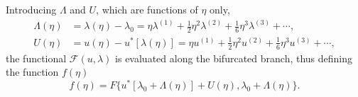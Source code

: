 \documentclass[12pt, final]{scrartcl}
\theoremstyle{definition}
\newcommand{\order}[2][1]{#2^{(#1)}}
\begin{document}
Introducing $\Lambda$ and $U$, which are functions of $\eta$ only,
\begin{align}
  \label{eq:20211112155446}
  \Lambda(\eta) & = \lambda(\eta) - \lambda_0 = \eta \order[1]\lambda + \tfrac{1}{2} \eta^2 \order[2]\lambda + \tfrac{1}{6} \eta^3 \order[3]\lambda + \cdots,\\
  \label{eq:20211112113028}
  U(\eta) & = u(\eta) - u^{\ast}[\lambda(\eta)] = \eta \order[1]u + \tfrac{1}{2} \eta^2 \order[2]u + \tfrac{1}{6} \eta^3 \order[3]u + \cdots,
\end{align}
the functional $\mathcal{F}(u, \lambda)$ is evaluated along the bifurcated branch,
thus defining the function $f(\eta)$
\begin{equation*}
  f(\eta) = F\{ u^{\ast} [\lambda_0 + \Lambda(\eta)] + U(\eta), \lambda_0 + \Lambda(\eta) \}.
\end{equation*}
\end{document}
